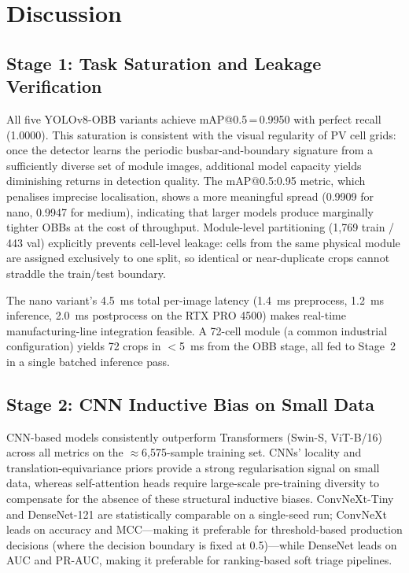 \documentclass[conference]{IEEEtran}
\begin{document}
\section{Discussion}
\label{sec:discussion}

\subsection{Stage 1: Task Saturation and Leakage Verification}

All five YOLOv8-OBB variants achieve mAP@0.5\,=\,0.9950 with perfect recall (1.0000). This saturation is consistent with the visual regularity of PV cell grids: once the detector learns the periodic busbar-and-boundary signature from a sufficiently diverse set of module images, additional model capacity yields diminishing returns in detection quality. The mAP@0.5:0.95 metric, which penalises imprecise localisation, shows a more meaningful spread (0.9909 for nano, 0.9947 for medium), indicating that larger models produce marginally tighter OBBs at the cost of throughput. Module-level partitioning (1{,}769 train / 443 val) explicitly prevents cell-level leakage: cells from the same physical module are assigned exclusively to one split, so identical or near-duplicate crops cannot straddle the train/test boundary.

The nano variant's 4.5~ms total per-image latency (1.4~ms preprocess, 1.2~ms inference, 2.0~ms postprocess on the RTX PRO 4500) makes real-time manufacturing-line integration feasible. A 72-cell module (a common industrial configuration) yields 72 crops in $<$5~ms from the OBB stage, all fed to Stage~2 in a single batched inference pass.

\subsection{Stage 2: CNN Inductive Bias on Small Data}

CNN-based models consistently outperform Transformers (Swin-S, ViT-B/16) across all metrics on the $\approx$6{,}575-sample training set. CNNs' locality and translation-equivariance priors provide a strong regularisation signal on small data, whereas self-attention heads require large-scale pre-training diversity to compensate for the absence of these structural inductive biases. ConvNeXt-Tiny and DenseNet-121 are statistically comparable on a single-seed run; ConvNeXt leads on accuracy and MCC---making it preferable for threshold-based production decisions (where the decision boundary is fixed at 0.5)---while DenseNet leads on AUC and PR-AUC, making it preferable for ranking-based soft triage pipelines.
\end{document}
